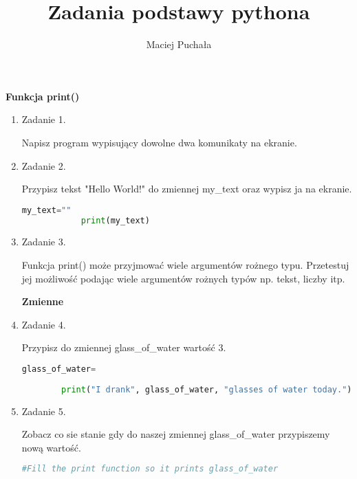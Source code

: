 \documentclass[11pt]{article}
\title{Zadania podstawy pythona}
\author{Maciej Puchała}
\begin{document}
	
	\maketitle
	\medskip
	\begin{Large}
		\textbf{Funkcja print()}
	\end{Large}
	
	\begin{enumerate}
		
		\item
		\begin{Large}
			Zadanie 1.
		\end{Large}
		\par
		Napisz program wypisujący dowolne dwa komunikaty na ekranie.
		
		
		\item
		\begin{Large}
			Zadanie 2.
		\end{Large}
		\par
		Przypisz tekst "Hello World!" do zmiennej my\_text oraz wypisz ja na ekranie.
		\begin{lstlisting}[language=Python]		
			my_text=""
			print(my_text)
		\end{lstlisting}
		
		\par
		\item 
		\begin{Large}
			Zadanie 3.
		\end{Large}
		\par
		Funkcja print() może przyjmować wiele argumentów rożnego typu. 
		Przetestuj jej możliwość podając wiele argumentów rożnych typów np. tekst, liczby itp.
		
		\medskip
		\begin{Large}
			\textbf{Zmienne}
		\end{Large}
		\par
		\item 
		\begin{Large}
			Zadanie 4.
		\end{Large}
	\par
	Przypisz do zmiennej glass\_of\_water wartość 3.
	\begin{lstlisting}[language=Python]
		glass_of_water=
		
		print("I drank", glass_of_water, "glasses of water today.")
	\end{lstlisting}

	\par
	\item 
	\begin{Large}
		Zadanie 5.
	\end{Large}
	\par
	Zobacz co sie stanie gdy do naszej zmiennej glass\_of\_water przypiszemy nową wartość.
	\begin{lstlisting}[language=Python]
		#Fill the print function so it prints glass_of_water
		

\end{lstlisting}
\end{enumerate}
\end{document}
